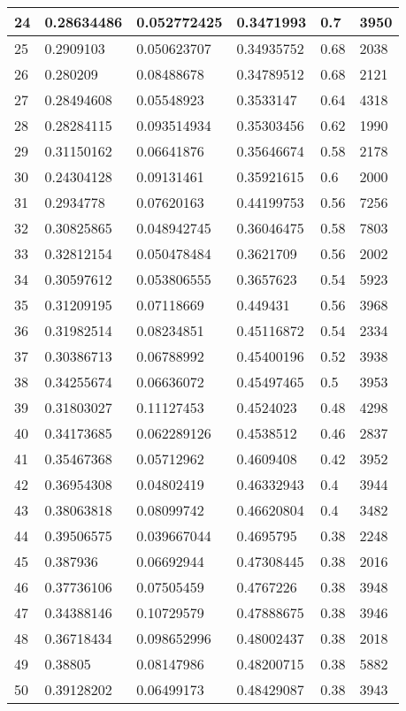 \begin{longtable}{|l|l|l|l|l|l|}
24 & 0.28634486 & 0.052772425 & 0.3471993 & 0.7 & 3950 \\ \hline 
25 & 0.2909103 & 0.050623707 & 0.34935752 & 0.68 & 2038 \\ \hline 
26 & 0.280209 & 0.08488678 & 0.34789512 & 0.68 & 2121 \\ \hline 
27 & 0.28494608 & 0.05548923 & 0.3533147 & 0.64 & 4318 \\ \hline 
28 & 0.28284115 & 0.093514934 & 0.35303456 & 0.62 & 1990 \\ \hline 
29 & 0.31150162 & 0.06641876 & 0.35646674 & 0.58 & 2178 \\ \hline 
30 & 0.24304128 & 0.09131461 & 0.35921615 & 0.6 & 2000 \\ \hline 
31 & 0.2934778 & 0.07620163 & 0.44199753 & 0.56 & 7256 \\ \hline 
32 & 0.30825865 & 0.048942745 & 0.36046475 & 0.58 & 7803 \\ \hline 
33 & 0.32812154 & 0.050478484 & 0.3621709 & 0.56 & 2002 \\ \hline 
34 & 0.30597612 & 0.053806555 & 0.3657623 & 0.54 & 5923 \\ \hline 
35 & 0.31209195 & 0.07118669 & 0.449431 & 0.56 & 3968 \\ \hline 
36 & 0.31982514 & 0.08234851 & 0.45116872 & 0.54 & 2334 \\ \hline 
37 & 0.30386713 & 0.06788992 & 0.45400196 & 0.52 & 3938 \\ \hline 
38 & 0.34255674 & 0.06636072 & 0.45497465 & 0.5 & 3953 \\ \hline 
39 & 0.31803027 & 0.11127453 & 0.4524023 & 0.48 & 4298 \\ \hline 
40 & 0.34173685 & 0.062289126 & 0.4538512 & 0.46 & 2837 \\ \hline 
41 & 0.35467368 & 0.05712962 & 0.4609408 & 0.42 & 3952 \\ \hline 
42 & 0.36954308 & 0.04802419 & 0.46332943 & 0.4 & 3944 \\ \hline 
43 & 0.38063818 & 0.08099742 & 0.46620804 & 0.4 & 3482 \\ \hline 
44 & 0.39506575 & 0.039667044 & 0.4695795 & 0.38 & 2248 \\ \hline 
45 & 0.387936 & 0.06692944 & 0.47308445 & 0.38 & 2016 \\ \hline 
46 & 0.37736106 & 0.07505459 & 0.4767226 & 0.38 & 3948 \\ \hline 
47 & 0.34388146 & 0.10729579 & 0.47888675 & 0.38 & 3946 \\ \hline 
48 & 0.36718434 & 0.098652996 & 0.48002437 & 0.38 & 2018 \\ \hline 
49 & 0.38805 & 0.08147986 & 0.48200715 & 0.38 & 5882 \\ \hline 
50 & 0.39128202 & 0.06499173 & 0.48429087 & 0.38 & 3943 \\ \hline 
\end{longtable}